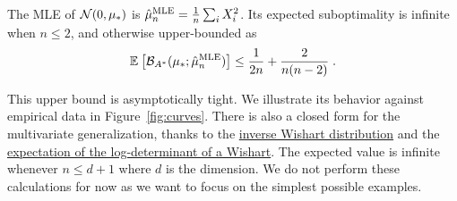 \documentclass{article}
\newcommand*{\expect}[2][]{\ensuremath{\mathbb{E}_{#1} \left[ #2 \right] }} %
\newcommand{\logpart}{A}
\newcommand{\bregmanconj}{\cB_{\logpart^*}}
\begin{document}
\begin{example}
	\begin{theorem}
	The MLE of ${\mathcal N}(0,\mu_*)$ is $\hat \mu_n^\text{MLE} = \frac{1}{n} \sum_i X_i^2 $.
	Its expected suboptimality is infinite when $n\leq 2$, and otherwise upper-bounded as
	\begin{align}
		 \expect{\bregmanconj( \mu_*; \hat \mu_n^\text{MLE}) }
			\leq \inv{2n} +\frac{2}{n(n-2)} \; .
			\label{eq:MLE_rate}
	\end{align}
\end{theorem}
\end{example}
This upper bound is asymptotically tight.
We illustrate its behavior against empirical data in Figure~\ref{fig:curves}.
 There is also a closed form for the multivariate generalization, thanks to the \href{https://en.wikipedia.org/wiki/Inverse-Wishart_distribution}{inverse Wishart distribution} and the \href{https://en.wikipedia.org/wiki/Wishart_distribution#Log-expectation}{expectation of the log-determinant of a Wishart}. The expected value is infinite whenever $n \leq d+1$ where $d$ is the dimension. We do not perform these calculations for now as we want to focus on the simplest possible examples.
 
\end{document}
